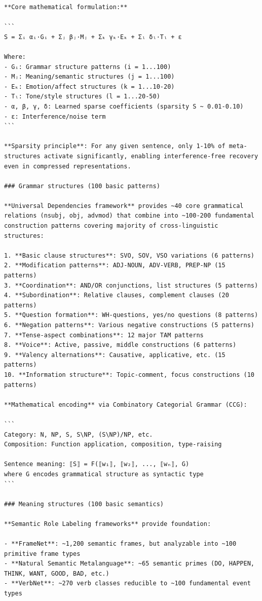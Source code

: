 \documentclass[11pt]{article}
\begin{document}
\begin{verbatim}
**Core mathematical formulation:**

```
S = Σᵢ αᵢ·Gᵢ + Σⱼ βⱼ·Mⱼ + Σₖ γₖ·Eₖ + Σₗ δₗ·Tₗ + ε

Where:
- Gᵢ: Grammar structure patterns (i = 1...100)
- Mⱼ: Meaning/semantic structures (j = 1...100)
- Eₖ: Emotion/affect structures (k = 1...10-20)
- Tₗ: Tone/style structures (l = 1...20-50)
- α, β, γ, δ: Learned sparse coefficients (sparsity S ~ 0.01-0.10)
- ε: Interference/noise term
```

**Sparsity principle**: For any given sentence, only 1-10% of meta-structures activate significantly, enabling interference-free recovery even in compressed representations.

### Grammar structures (100 basic patterns)

**Universal Dependencies framework** provides ~40 core grammatical relations (nsubj, obj, advmod) that combine into ~100-200 fundamental construction patterns covering majority of cross-linguistic structures:

1. **Basic clause structures**: SVO, SOV, VSO variations (6 patterns)
2. **Modification patterns**: ADJ-NOUN, ADV-VERB, PREP-NP (15 patterns)
3. **Coordination**: AND/OR conjunctions, list structures (5 patterns)
4. **Subordination**: Relative clauses, complement clauses (20 patterns)
5. **Question formation**: WH-questions, yes/no questions (8 patterns)
6. **Negation patterns**: Various negative constructions (5 patterns)
7. **Tense-aspect combinations**: 12 major TAM patterns
8. **Voice**: Active, passive, middle constructions (6 patterns)
9. **Valency alternations**: Causative, applicative, etc. (15 patterns)
10. **Information structure**: Topic-comment, focus constructions (10 patterns)

**Mathematical encoding** via Combinatory Categorial Grammar (CCG):

```
Category: N, NP, S, S\NP, (S\NP)/NP, etc.
Composition: Function application, composition, type-raising

Sentence meaning: ⟦S⟧ = F(⟦w₁⟧, ⟦w₂⟧, ..., ⟦wₙ⟧, G)
where G encodes grammatical structure as syntactic type
```

### Meaning structures (100 basic semantics)

**Semantic Role Labeling frameworks** provide foundation:

- **FrameNet**: ~1,200 semantic frames, but analyzable into ~100 primitive frame types
- **Natural Semantic Metalanguage**: ~65 semantic primes (DO, HAPPEN, THINK, WANT, GOOD, BAD, etc.)
- **VerbNet**: ~270 verb classes reducible to ~100 fundamental event types


\end{verbatim}
\end{document}
